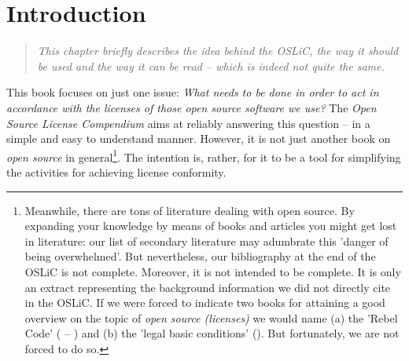 %
%
%
%
%




\chapter{Introduction}

\footnotesize \begin{quote}\itshape
This chapter briefly describes the idea behind the OSLiC, the way it should be
used and the way it can be read -- which is indeed not quite the same.
\end{quote}
\normalsize{}

This book focuses on just one issue: \emph{What needs to be done in order to act
in accordance with the licenses of those \emph{open source software} we use?}
The \emph{Open Source License Compendium} aims at reliably answering this
question -- in a simple and easy to understand manner. However, it is not just
another book on \emph{open source} in ge\-ne\-ral\footnote{Meanwhile, there are
tons of literature dealing with open source. By expanding your knowledge by
means of books and articles you might get lost in literature: our list of
secondary literature may adumbrate this 'danger of being overwhelmed'. But
nevertheless, our bibliography at the end of the OSLiC is not complete.
Moreover, it is not intended to be complete. It is only an extract representing
the background information we did not directly cite in the OSLiC. If we were
forced to indicate two books for attaining a good overview on the topic of
\emph{open source (licenses)} we would name (a) the 'Rebel Code' (\cite[for a
German version cf.][\nopage passim]{Moody2001a} -- \cite[for an English version
cf.][passim]{Moody2002a}) and (b) the 'legal basic conditions'
(\cite[cf.][\nopage passim]{JaeMet2011a}). But fortunately, we are not forced to
do so.}. The intention is, rather, for it to be a tool for simplifying the
activities for achieving license conformity.

